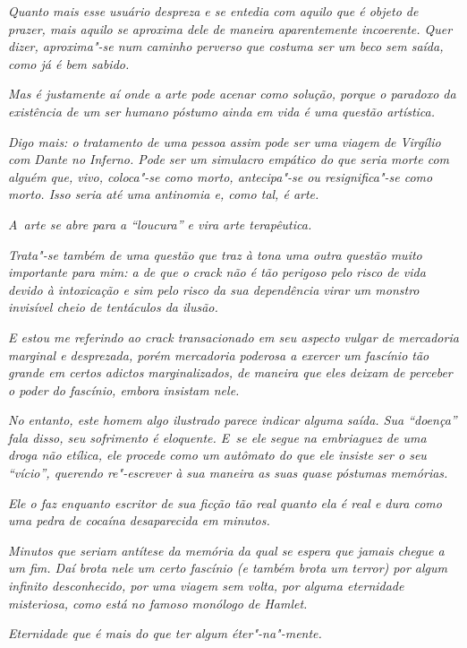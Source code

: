 \emph{Quanto mais esse usuário despreza e se entedia com aquilo que é
objeto de prazer, mais aquilo se aproxima dele de maneira aparentemente
incoerente. Quer dizer, aproxima"-se num caminho perverso que costuma ser
um beco sem saída, como já é bem sabido.}~

\emph{Mas é justamente aí onde a arte pode acenar como solução, porque o
paradoxo da existência de um ser humano póstumo ainda em vida é uma
questão artística.}~

\emph{Digo mais: o tratamento de uma pessoa assim pode ser uma viagem de
Virgílio com Dante no Inferno. Pode ser um simulacro empático do que
seria morte com alguém que, vivo, coloca"-se como morto, antecipa"-se ou
resignifica"-se como morto. Isso seria até uma antinomia e, como tal, é
arte.}~

\emph{A~arte se abre para a ``loucura'' e vira arte terapêutica.}~

\emph{Trata"-se também de uma questão que traz à tona uma outra questão
muito importante para mim: a de que o crack não é tão perigoso pelo
risco de vida devido à intoxicação e sim pelo risco da sua dependência
virar um monstro invisível cheio de tentáculos da ilusão.}~

\emph{E estou me referindo ao crack transacionado em seu aspecto vulgar
de mercadoria marginal e desprezada, porém mercadoria poderosa a exercer
um fascínio tão grande em certos adictos marginalizados, de maneira que
eles deixam de perceber o poder do fascínio, embora insistam nele.}~

\emph{No entanto, este homem algo ilustrado parece indicar alguma saída.
Sua ``doença'' fala disso, seu sofrimento é eloquente. E~se ele segue na
embriaguez de uma droga não etílica, ele procede como um autômato do que
ele insiste ser o seu ``vício'', querendo re"-escrever à sua maneira as
suas quase póstumas memórias.}~

\emph{Ele o faz enquanto escritor de sua ficção tão real quanto ela é
real e dura como uma pedra de cocaína desaparecida em minutos.}~

\emph{Minutos que seriam antítese da memória da qual se espera que
jamais chegue a um fim. Daí brota nele um certo fascínio (e também brota
um terror) por algum infinito desconhecido, por uma viagem sem volta,
por alguma eternidade misteriosa, como está no famoso monólogo de
Hamlet.}~

\emph{Eternidade que é mais do que ter algum éter"-na"-mente.}
